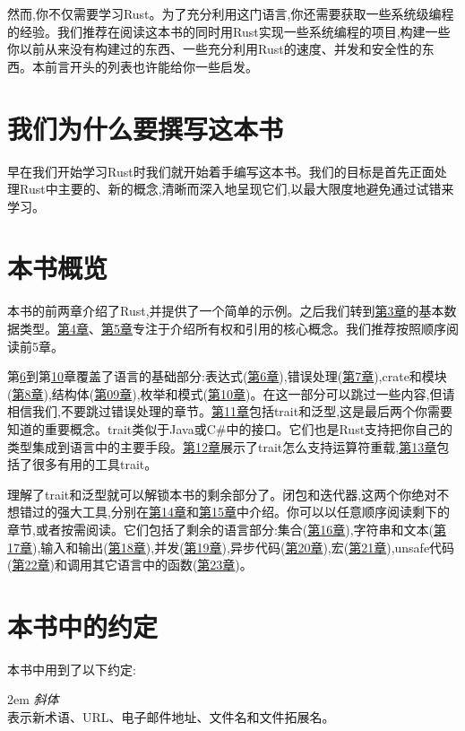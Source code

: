 然而,你不仅需要学习Rust。为了充分利用这门语言,你还需要获取一些系统级编程的经验。我们推荐在阅读这本书的同时用Rust实现一些系统编程的项目,构建一些你以前从来没有构建过的东西、一些充分利用Rust的速度、并发和安全性的东西。本前言开头的列表也许能给你一些启发。

\section*{我们为什么要撰写这本书}
早在我们开始学习Rust时我们就开始着手编写这本书。我们的目标是首先正面处理Rust中主要的、新的概念,清晰而深入地呈现它们,以最大限度地避免通过试错来学习。

\section*{本书概览}
本书的前两章介绍了Rust,并提供了一个简单的示例。之后我们转到\hyperref[ch03]{第3章}的基本数据类型。\hyperref[ch04]{第4章}、\hyperref[ch05]{第5章}专注于介绍所有权和引用的核心概念。我们推荐按照顺序阅读前5章。

第\hyperref[ch06]{6}到第\hyperref[ch10]{10}章覆盖了语言的基础部分:表达式(\hyperref[ch06]{第6章}),错误处理(\hyperref[ch07]{第7章}),crate和模块(\hyperref[ch08]{第8章}),结构体(\hyperref[ch9]{第09章}),枚举和模式(\hyperref[ch10]{第10章})。在这一部分可以跳过一些内容,但请相信我们,不要跳过错误处理的章节。\hyperref[ch11]{第11章}包括trait和泛型,这是最后两个你需要知道的重要概念。trait类似于Java或C\#中的接口。它们也是Rust支持把你自己的类型集成到语言中的主要手段。\hyperref[ch12]{第12章}展示了trait怎么支持运算符重载,\hyperref[ch13]{第13章}包括了很多有用的工具trait。

理解了trait和泛型就可以解锁本书的剩余部分了。闭包和迭代器,这两个你绝对不想错过的强大工具,分别在\hyperref[ch14]{第14章}和\hyperref[ch15]{第15章}中介绍。你可以以任意顺序阅读剩下的章节,或者按需阅读。它们包括了剩余的语言部分:集合(\hyperref[ch16]{第16章}),字符串和文本(\hyperref[ch17]{第17章}),输入和输出(\hyperref[ch18]{第18章}),并发(\hyperref[ch19]{第19章}),异步代码(\hyperref[ch20]{第20章}),宏(\hyperref[ch21]{第21章}),unsafe代码(\hyperref[ch22]{第22章})和调用其它语言中的函数(\hyperref[ch23]{第23章})。

\section*{本书中的约定}
本书中用到了以下约定:

\hangindent 2em
\noindent
\emph{斜体}\\
表示新术语、URL、电子邮件地址、文件名和文件拓展名。

